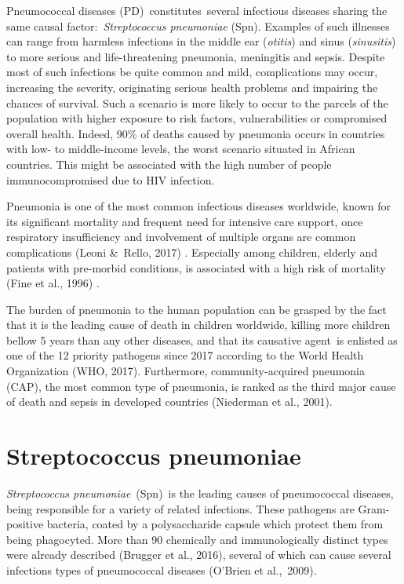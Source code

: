 \documentclass[
]{book}
\begin{document}
Pneumococcal diseases (PD)~constitutes~several infectious diseases sharing the same causal factor:~\emph{Streptococcus pneumoniae} (Spn). Examples of such illnesses can range from harmless infections in the middle ear (\emph{otitis}) and sinus (\emph{sinusitis}) to more serious and life-threatening pneumonia, meningitis and sepsis. Despite most of such infections be quite common and mild, complications may occur, increasing the severity, originating serious health problems and impairing the chances of survival. Such a scenario is more likely to occur to the parcels of the population with higher exposure to risk factors, vulnerabilities or compromised overall health. Indeed, 90\% of deaths caused by pneumonia occurs in countries with low- to middle-income levels, the worst scenario situated in African countries. This might be associated with the high number of people immunocompromised due to HIV infection.

Pneumonia is one of the most common infectious diseases worldwide, known for its significant mortality and frequent need for intensive care support, once respiratory insufficiency and involvement of multiple organs are common complications (Leoni \&~Rello, 2017) ⁠. Especially among children, elderly and patients with pre-morbid conditions, is associated with a high risk of mortality (Fine et al., 1996) ⁠.

The burden of pneumonia to the human population can be grasped by the fact that it is the leading cause of death in children worldwide, killing more children bellow 5 years than any other diseases, and that its causative agent~is enlisted as one of the 12 priority pathogens since 2017 according to the World Health Organization (WHO, 2017)⁠. Furthermore, community-acquired pneumonia (CAP), the most common type of pneumonia, is ranked as the third major cause of death and sepsis in developed countries (Niederman et al., 2001).

\hypertarget{streptococcus-pneumoniae}{%
\section{Streptococcus pneumoniae}\label{streptococcus-pneumoniae}}

\emph{Streptococcus pneumoniae}~(Spn)~is the leading causes of pneumococcal diseases, being responsible for a variety of related infections. These pathogens are Gram-positive bacteria, coated by a polysaccharide capsule which protect them from being phagocyted. More than 90 chemically and immunologically distinct types were already described (Brugger et al., 2016), several of which can cause several infections types of pneumococcal diseases (O'Brien et al.,~2009)⁠.
\end{document}

